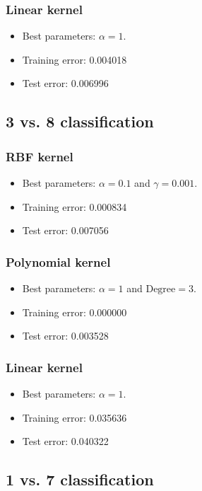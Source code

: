 \documentclass[12pt,a4paper]{article}
\theoremstyle{definition}
\theoremstyle{remark}
\begin{document}
\subsubsection{Linear kernel}
\begin{itemize}
    \item Best parameters: $\alpha = 1$. 
    \item Training error: 0.004018
    \item Test error: 0.006996
\end{itemize}

\subsection{3 vs. 8 classification}
\subsubsection{RBF kernel}
\begin{itemize}
    \item Best parameters: $\alpha = 0.1$ and $\gamma = 0.001$. 
    \item Training error: 0.000834
    \item Test error: 0.007056
\end{itemize}

\subsubsection{Polynomial kernel}
\begin{itemize}
    \item Best parameters: $\alpha = 1$ and $\text{Degree} = 3$. 
    \item Training error: 0.000000
    \item Test error: 0.003528
\end{itemize}

\subsubsection{Linear kernel}
\begin{itemize}
    \item Best parameters: $\alpha = 1$. 
    \item Training error: 0.035636
    \item Test error: 0.040322
\end{itemize}

\subsection{1 vs. 7 classification}
\end{document}
